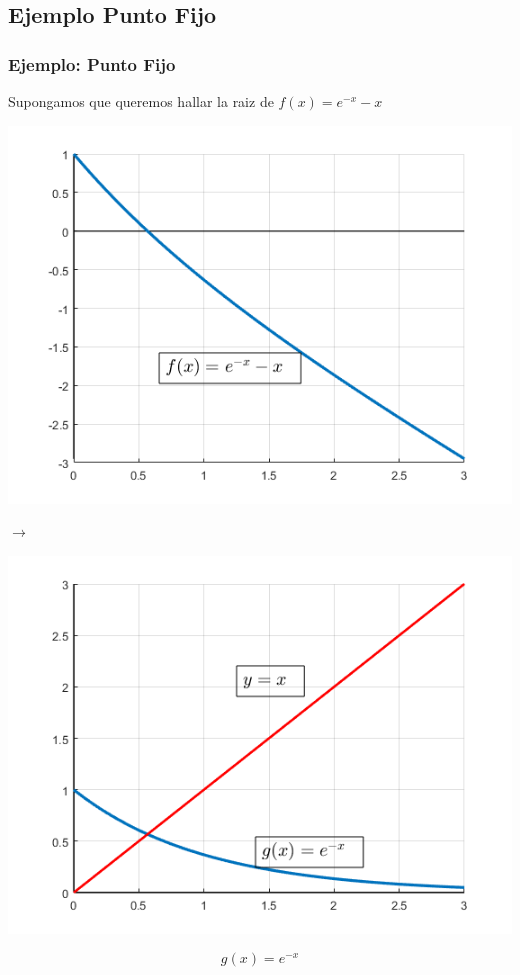 \documentclass[xcolor=svgnames]{beamer} %
\theoremstyle{plain}
\theoremstyle{definition}
\begin{document}
\begin{frame}
\begin{minipage}{.45\linewidth}
\end{minipage}



\end{frame}

\subsection{Ejemplo Punto Fijo}


\begin{frame}
\frametitle{Ejemplo: Punto Fijo}

Supongamos que queremos hallar la raiz de $f(x) = e^{-x} -x$



\begin{minipage}{.45\linewidth}
\includegraphics[width=\linewidth]{fp_example/f.png} 

\end{minipage} $\rightarrow$  \begin{minipage}{.45\linewidth}
\includegraphics[width=\linewidth]{fp_example/g.png} 
\end{minipage}

$$g(x) = e^{-x}$$
\end{frame}
\end{document}
